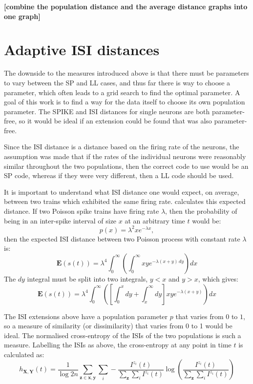 {\bf [combine the population distance and the average distance graphs into one graph]}

\newpage
\section{Adaptive ISI distances}

The downside to the measures introduced above is that there must be parameters to vary between the SP and LL cases, and thus far there is way to choose a parameter, which often leads to a grid search to find the optimal parameter.  A goal of this work is to find a way for the data itself to choose its own population parameter.  The SPIKE and ISI distances for single neurons are both parameter-free, so it would be ideal if an extension could be found that was also parameter-free.

Since the ISI distance is a distance based on the firing rate of the neurons, the assumption was made that if the rates of the individual neurons were reasonably similar throughout the two populations, then the correct code to use would be an SP code, whereas if they were very different, then a LL code should be used.

It is important to understand what ISI distance one would expect, on average, between two trains which exhibited the same firing rate.  \cite{MulanskyEtAl2015a} calculates this expected distance. If two Poisson spike trains have firing rate $\lambda$, then the probability of being in an inter-spike interval of size $x$ at an arbitrary time $t$ would be:
\begin{equation}
p(x) = \lambda^2 x e^{-\lambda x},
\end{equation}
then the expected ISI distance between two Poisson process with constant rate $\lambda$ is:
\begin{equation}
\mathbf{E}(s(t)) = \lambda^4 \int_0^{\infty} \left( \int_0^{\infty} xye^{-\lambda(x+y)\,dy}\right) dx
\end{equation}
The $dy$ integral must be split into two integrals, $y<x$ and $y>x$, which gives:
\begin{equation}
\mathbf{E}(s(t))  = \lambda^4 \int_0^{\infty}\left(  \left[\int_0^xdy +\int_x^{\infty}dy\right] xye^{-\lambda(x+y)} \right)dx
\end{equation}

The ISI extensions above have a population parameter $p$ that varies from $0$ to $1$, so a measure of similarity (or dissimilarity) that varies from 0 to 1 would be ideal.  The normalised cross-entropy of the ISIs of the two populations is such a measure.  Labelling the ISIs as above, the cross-entropy at any point in time $t$ is calculated as:
\begin{equation}
h_{\mathbf{X}, \mathbf{Y}}(t) = \frac{1}{\log 2n}\sum_{\mathbf{z}\in\mathbf{x,y}}\sum_i -\frac{I^{z_i}(t)}{\sum_{\mathbf{z}}\sum_i I^{z_i}(t)} \log\left(\frac{I^{z_i}(t)}{\sum_{\mathbf{z}}\sum_i I^{z_i}(t)}\right)
\end{equation}

